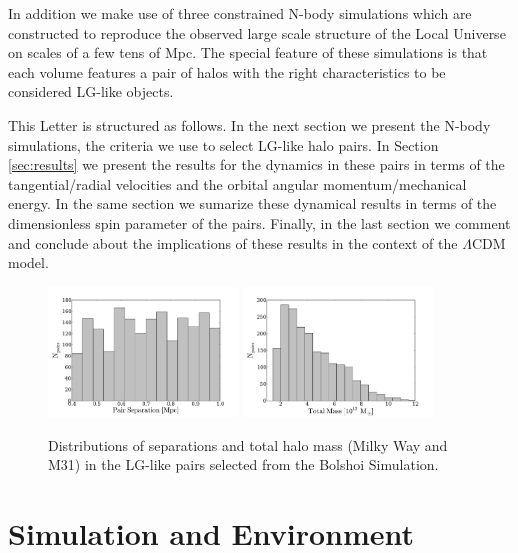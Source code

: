 \documentclass{emulateapj}
\begin{document}
In addition we make use of three  constrained N-body simulations which are constructed to reproduce the observed large scale structure of the Local Universe on scales of a few tens of Mpc. The special feature of these simulations is that each volume features a pair of halos with the right characteristics to be considered LG-like objects.

This Letter is structured as follows. In the next section we present the N-body simulations, the criteria we use to select LG-like halo pairs. In Section \ref{sec:results} we present the results for the dynamics in these pairs in terms of the tangential/radial velocities and the orbital angular momentum/mechanical energy. In the same section we sumarize these dynamical results in terms of the dimensionless spin parameter of the pairs. Finally, in the last section we comment and conclude about the implications of these results in the context of the $\Lambda$CDM model.





\label{subsec:lg-sample}
\begin{figure}
\begin{center}
\includegraphics[keepaspectratio=true,width=0.45\textwidth]{./figures/separation_BDM.pdf}
\includegraphics[keepaspectratio=true,width=0.45\textwidth]{./figures/total_mass_BDM.pdf}
\caption{\label{fig:distros} Distributions of separations and total halo mass (Milky Way and M31) in the LG-like pairs selected from the Bolshoi Simulation.}
\end{center}
\end{figure}

\section{Simulation and Environment}
\label{sec:methods}
\end{document}
